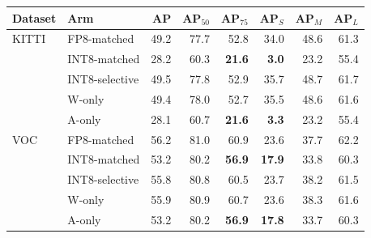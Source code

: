 \begin{tabular}{llrrrrrr}
\toprule
Dataset & Arm & AP & AP$_{50}$ & AP$_{75}$ & AP$_S$ & AP$_M$ & AP$_L$ \\
\midrule
KITTI & FP8-matched & 49.2 & 77.7 & 52.8 & 34.0 & 48.6 & 61.3 \\
 & INT8-matched & 28.2 & 60.3 & \textbf{21.6} & \textbf{3.0} & 23.2 & 55.4 \\
 & INT8-selective & 49.5 & 77.8 & 52.9 & 35.7 & 48.7 & 61.7 \\
 & W-only & 49.4 & 78.0 & 52.7 & 35.5 & 48.6 & 61.6 \\
 & A-only & 28.1 & 60.7 & \textbf{21.6} & \textbf{3.3} & 23.2 & 55.4 \\
\addlinespace[4pt]
VOC & FP8-matched & 56.2 & 81.0 & 60.9 & 23.6 & 37.7 & 62.2 \\
 & INT8-matched & 53.2 & 80.2 & \textbf{56.9} & \textbf{17.9} & 33.8 & 60.3 \\
 & INT8-selective & 55.8 & 80.8 & 60.5 & 23.7 & 38.2 & 61.5 \\
 & W-only & 55.9 & 80.9 & 60.7 & 23.6 & 38.3 & 61.6 \\
 & A-only & 53.2 & 80.2 & \textbf{56.9} & \textbf{17.8} & 33.7 & 60.3 \\
\bottomrule
\end{tabular}
